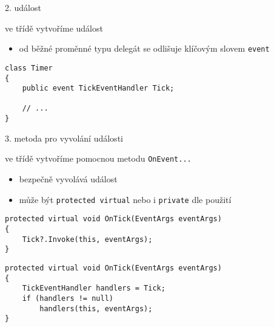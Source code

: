 \begin{frame}[fragile]
\vfill
\begin{bitemize}{2. událost}
\item ve třídě vytvoříme událost
\begin{itemize}
\item od běžné proměnné typu delegát se odlišuje klíčovým slovem \lstinline|event|
\end{itemize}
\end{bitemize}
\vfill
\begin{yesblock}
\begin{lstlisting}
class Timer
{
    public event TickEventHandler Tick;

    // ...
}
\end{lstlisting}
\end{yesblock}
\vfill
\end{frame}




\begin{frame}[fragile]
\begin{bitemize}{3. metoda pro vyvolání události}
\item ve třídě vytvoříme pomocnou metodu \lstinline|OnEvent...|
\begin{itemize}
\item bezpečně vyvolává událost
\item může být \lstinline|protected virtual| nebo i \lstinline|private| dle použití
\end{itemize}
\end{bitemize}
\vfill
\begin{yesblock}
\begin{lstlisting}
protected virtual void OnTick(EventArgs eventArgs)
{
    Tick?.Invoke(this, eventArgs);
}
\end{lstlisting}
\end{yesblock}
\vfill
\begin{oldblock}
\begin{lstlisting}
protected virtual void OnTick(EventArgs eventArgs)
{
    TickEventHandler handlers = Tick;
    if (handlers != null)
        handlers(this, eventArgs);
}
\end{lstlisting}
\end{oldblock}
\end{frame}







